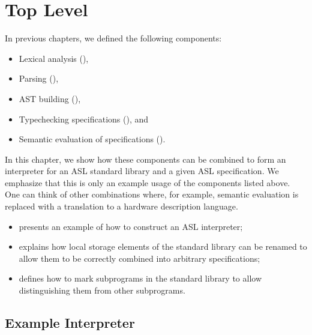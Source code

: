 \chapter{Top Level\label{chap:TopLevel}}
In previous chapters, we defined the following components:
\begin{itemize}
    \item Lexical analysis (),
    \item Parsing (),
    \item AST building (),
    \item Typechecking specifications (), and
    \item Semantic evaluation of specifications ().
\end{itemize}

In this chapter, we show how these components can be combined to form an interpreter
for an ASL standard library and a given ASL specification.
%
We emphasize that this is only an example usage of the components listed above.
One can think of other combinations where, for example, semantic evaluation is
replaced with a translation to a hardware description language.

\ChapterOutline
\begin{itemize}
  \item {} presents an example of how to construct an ASL interpreter;
  \item {} explains how local storage
        elements of the standard library can be renamed to allow them to be correctly combined into
        arbitrary specifications;
  \item {} defines how to mark subprograms in the standard
        library to allow distinguishing them from other subprograms.
\end{itemize}

\section{Example Interpreter\label{sec:Example Interpreter}}

